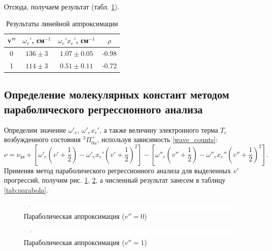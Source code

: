 Отсюда, получаем результат (табл. \ref{tab:linear_approx}).
\begin{table}[h!]
	\centering
	\caption{Результаты линейной аппроксимации}
	\begin{tabular}{|c|c|c|c|}
		\hline
		\multicolumn{1}{|l|}{v''} & \multicolumn{1}{l|}{$\omega_e'$, см$^{-1}$} & \multicolumn{1}{l|}{$\omega_e' x_e'$, см$^{-1}$} & \multicolumn{1}{c|}{$\rho$} \bigstrut\\
		\hline
		0 & $136\pm 3$ & $1.07\pm 0.05$& -0.98 \bigstrut\\
		\hline
		1 & $114\pm 3$& $0.51\pm 0.11$ & -0.72 \bigstrut\\
		\hline
	\end{tabular}%
	\label{tab:linear_approx}%
\end{table}%

\subsection{Определение молекулярных констант методом параболического регрессионного анализа}

Определим значение $\omega'_e$, $\omega'_e x_e'$, а также величину электронного терма $T_e$ возбужденного состояния $^3\Pi^+_{0u}$, используя зависимость \eqref{wave_counts}:
\begin{equation}
\nu = \nu_{\text{эл}} + \left[\omega'_e\left(v'+\frac{1}{2}\right)-\omega'_e x_e'\left(v'+\frac{1}{2}\right)^2\right]-\left[\omega''_e\left(v''+\frac{1}{2}\right)-\omega''_e x_e''\left(v''+\frac{1}{2}\right)^2\right].
\label{wave_counts}
\end{equation}
Применяя метод параболического регрессионного анализа для выделенных $v'$ прогрессий, получим рис. \ref{parabola_half_0}, \ref{parabola_half_1}, а численный результат занесем в таблицу \ref{tab:parabola}.
\begin{figure}[h!]
	\centering
	\includegraphics[height=0.4\textheight]{data/parabola_half_0}
	\caption{Параболическая аппроксимация ($v'' = 0$)}
	\label{parabola_half_0}
\end{figure}
\begin{figure}[h!]
	\centering
	\includegraphics[height=0.4\textheight]{data/parabola_half_1}
	\caption{Параболическая аппроксимация ($v'' = 1$)}
	\label{parabola_half_1}
\end{figure}

